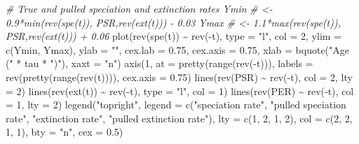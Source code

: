 \documentclass[
]{article}
\newenvironment{Shaded}{\begin{snugshade}}{\end{snugshade}}
\newcommand{\AttributeTok}[1]{\textcolor[rgb]{0.77,0.63,0.00}{#1}}
\newcommand{\CommentTok}[1]{\textcolor[rgb]{0.56,0.35,0.01}{\textit{#1}}}
\newcommand{\DecValTok}[1]{\textcolor[rgb]{0.00,0.00,0.81}{#1}}
\newcommand{\FloatTok}[1]{\textcolor[rgb]{0.00,0.00,0.81}{#1}}
\newcommand{\FunctionTok}[1]{\textcolor[rgb]{0.00,0.00,0.00}{#1}}
\newcommand{\NormalTok}[1]{#1}
\newcommand{\SpecialCharTok}[1]{\textcolor[rgb]{0.00,0.00,0.00}{#1}}
\newcommand{\StringTok}[1]{\textcolor[rgb]{0.31,0.60,0.02}{#1}}
\begin{document}
\begin{Shaded}
\begin{Highlighting}[]
    \CommentTok{\# True and pulled speciation and extinction rates Ymin}
    \CommentTok{\# \textless{}{-} 0.9*min(rev(spe(t)), PSR,rev(ext(t))) {-} 0.03 Ymax}
    \CommentTok{\# \textless{}{-} 1.1*max(rev(spe(t)), PSR,rev(ext(t))) + 0.06}
    \FunctionTok{plot}\NormalTok{(}\FunctionTok{rev}\NormalTok{(}\FunctionTok{spe}\NormalTok{(t)) }\SpecialCharTok{\textasciitilde{}} \FunctionTok{rev}\NormalTok{(}\SpecialCharTok{{-}}\NormalTok{t), }\AttributeTok{type =} \StringTok{"l"}\NormalTok{, }\AttributeTok{col =} \DecValTok{2}\NormalTok{, }\AttributeTok{ylim =} \FunctionTok{c}\NormalTok{(Ymin,}
\NormalTok{        Ymax), }\AttributeTok{ylab =} \StringTok{""}\NormalTok{, }\AttributeTok{cex.lab =} \FloatTok{0.75}\NormalTok{, }\AttributeTok{cex.axis =} \FloatTok{0.75}\NormalTok{, }\AttributeTok{xlab =} \FunctionTok{bquote}\NormalTok{(}\StringTok{"Age ("} \SpecialCharTok{*}
\NormalTok{        tau }\SpecialCharTok{*} \StringTok{")"}\NormalTok{), }\AttributeTok{xaxt =} \StringTok{"n"}\NormalTok{)}
    \FunctionTok{axis}\NormalTok{(}\DecValTok{1}\NormalTok{, }\AttributeTok{at =} \FunctionTok{pretty}\NormalTok{(}\FunctionTok{range}\NormalTok{(}\FunctionTok{rev}\NormalTok{(}\SpecialCharTok{{-}}\NormalTok{t))), }\AttributeTok{labels =} \FunctionTok{rev}\NormalTok{(}\FunctionTok{pretty}\NormalTok{(}\FunctionTok{range}\NormalTok{(}\FunctionTok{rev}\NormalTok{(t)))),}
        \AttributeTok{cex.axis =} \FloatTok{0.75}\NormalTok{)}
    \FunctionTok{lines}\NormalTok{(}\FunctionTok{rev}\NormalTok{(PSR) }\SpecialCharTok{\textasciitilde{}} \FunctionTok{rev}\NormalTok{(}\SpecialCharTok{{-}}\NormalTok{t), }\AttributeTok{col =} \DecValTok{2}\NormalTok{, }\AttributeTok{lty =} \DecValTok{2}\NormalTok{)}
    \FunctionTok{lines}\NormalTok{(}\FunctionTok{rev}\NormalTok{(}\FunctionTok{ext}\NormalTok{(t)) }\SpecialCharTok{\textasciitilde{}} \FunctionTok{rev}\NormalTok{(}\SpecialCharTok{{-}}\NormalTok{t), }\AttributeTok{type =} \StringTok{"l"}\NormalTok{, }\AttributeTok{col =} \DecValTok{1}\NormalTok{)}
    \FunctionTok{lines}\NormalTok{(}\FunctionTok{rev}\NormalTok{(PER) }\SpecialCharTok{\textasciitilde{}} \FunctionTok{rev}\NormalTok{(}\SpecialCharTok{{-}}\NormalTok{t), }\AttributeTok{col =} \DecValTok{1}\NormalTok{, }\AttributeTok{lty =} \DecValTok{2}\NormalTok{)}
    \FunctionTok{legend}\NormalTok{(}\StringTok{"topright"}\NormalTok{, }\AttributeTok{legend =} \FunctionTok{c}\NormalTok{(}\StringTok{"speciation rate"}\NormalTok{, }\StringTok{"pulled speciation rate"}\NormalTok{,}
        \StringTok{"extinction rate"}\NormalTok{, }\StringTok{"pulled extinction rate"}\NormalTok{), }\AttributeTok{lty =} \FunctionTok{c}\NormalTok{(}\DecValTok{1}\NormalTok{,}
        \DecValTok{2}\NormalTok{, }\DecValTok{1}\NormalTok{, }\DecValTok{2}\NormalTok{), }\AttributeTok{col =} \FunctionTok{c}\NormalTok{(}\DecValTok{2}\NormalTok{, }\DecValTok{2}\NormalTok{, }\DecValTok{1}\NormalTok{, }\DecValTok{1}\NormalTok{), }\AttributeTok{bty =} \StringTok{"n"}\NormalTok{, }\AttributeTok{cex =} \FloatTok{0.5}\NormalTok{)}


\end{Highlighting}
\end{Shaded}
\end{document}
